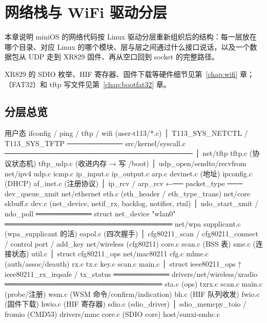 \chapter{网络栈与 WiFi 驱动分层}
\label{chap:netstack}

本章说明 miniOS 的网络代码按 Linux 驱动分层重新组织后的结构：每一层放在哪个目录、对应 Linux 的哪个模块、层与层之间通过什么接口说话，以及一个数据包从 UDP 走到 XR829 固件、再从空口回到 socket 的完整路径。

XR829 的 SDIO 枚举、HIF 寄存器、固件下载等硬件细节见第~\ref{chap:wifi} 章；（FAT32）和 tftp 写文件见第~\ref{chap:bootfat32} 章。

\section{分层总览}

\begin{txtcode}[basicstyle=\ttfamily\scriptsize]
 用户态  ifconfig / ping / tftp / wifi        (user-t113/*.c)
            │ T113_SYS_NETCTL / T113_SYS_TFTP
 ─────────── src/kernel/syscall.c ─────────────────────────────────────
            │
 net/tftp   tftp.c (协议状态机)  tftp_udp.c (收进内存 → 写 /boot)
            │ udp_open/sendto/recvfrom
 net/ipv4   udp.c  icmp.c  ip_input.c  ip_output.c  arp.c
            devinet.c (地址)  ipconfig.c (DHCP)  af_inet.c (注册协议)
            │ ip_rcv / arp_rcv  ←── packet_type ───  dev_queue_xmit
 net/ethernet  eth.c (eth_header / eth_type_trans)
 net/core   skbuff.c  dev.c (net_device, netif_rx, backlog, notifier, rtnl)
            │ ndo_start_xmit / ndo_poll
 ═══════════ struct net_device "wlan0" ═════════════════════════════════
 net/wpa    supplicant.c (wpa_supplicant 的活)  eapol.c (四次握手)
            │ cfg80211_scan / cfg80211_connect / control port / add_key
 net/wireless (cfg80211)  core.c  scan.c (BSS 表)  sme.c (连接状态)  util.c
            │ struct cfg80211_ops
 net/mac80211  cfg.c  mlme.c (auth/assoc/deauth)  rx.c  tx.c  key.c  scan.c  main.c
            │ struct ieee80211_ops            ↑ ieee80211_rx_irqsafe / tx_status
 ═══════════ drivers/net/wireless/xradio ═══════════════════════════════
            sta.c (ops)  txrx.c  scan.c  main.c (probe/注册)
            wsm.c (WSM 命令/confirm/indication)
            bh.c  (HIF 队列收发)   fwio.c (固件下载)   hwio.c (HIF 寄存器)
            sdio.c (sdio_driver)
            │ sdio_memcpy_toio / fromio (CMD53)
 drivers/mmc  core.c (SDIO core)  host/sunxi-smhc.c
\end{txtcode}

